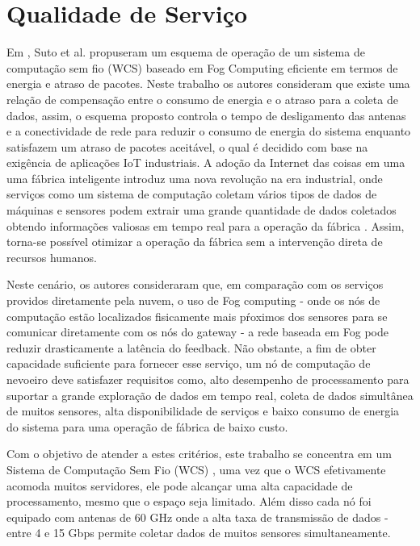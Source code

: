 \section{Qualidade de Serviço}

Em \cite{suto2015energy}, Suto et al. propuseram um esquema de operação de um sistema de computação sem fio (WCS) baseado em Fog Computing eficiente em termos de energia e atraso de pacotes. Neste trabalho os autores consideram que existe uma relação de compensação entre o consumo de energia e o atraso para a coleta de dados, assim, o esquema proposto controla o tempo de desligamento das antenas e a conectividade de rede para reduzir o consumo de energia do sistema enquanto satisfazem um atraso de pacotes aceitável, o qual é decidido com base na exigência de aplicações IoT industriais. A adoção da Internet das coisas em uma uma fábrica inteligente introduz uma nova revolução na era industrial, onde serviços como um sistema de computação coletam vários tipos de dados de máquinas e sensores podem extrair uma grande quantidade de dados coletados obtendo informações valiosas em tempo real para a operação da fábrica \cite{salvadori2009monitoring,ovsthus2014industrial}. Assim, torna-se possível otimizar a operação da fábrica sem a intervenção direta de recursos humanos. 

Neste cenário, os autores consideraram que, em comparação com os serviços providos diretamente pela nuvem, o uso de Fog computing - onde os nós de computação estão localizados fisicamente mais pŕoximos dos sensores para se comunicar diretamente com os nós do gateway - a rede baseada em Fog pode reduzir drasticamente a latência do feedback. Não obstante, a fim de obter capacidade suficiente para fornecer esse serviço, um nó de computação de nevoeiro deve satisfazer requisitos como, alto desempenho de processamento para suportar a grande exploração de dados em tempo real, coleta de dados simultânea de muitos sensores, alta disponibilidade de serviços e baixo consumo de energia do sistema para uma operação de fábrica de baixo custo.

Com o objetivo de atender a estes critérios, este trabalho se concentra em um Sistema de Computação Sem Fio  (WCS) \cite{shin2013feasibility,suto2015failure}, uma vez que o WCS efetivamente acomoda muitos servidores, ele pode alcançar uma alta capacidade de processamento, mesmo que o espaço seja limitado. Além disso cada nó foi equipado com antenas de 60 GHz onde a alta taxa de transmissão de dados - entre  4 e 15 Gbps permite coletar dados de muitos sensores simultaneamente.

